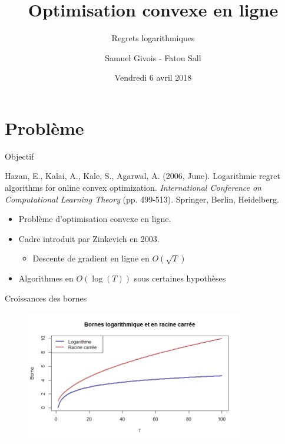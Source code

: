 \documentclass[aspectratio=1610,17pt,utf8]{beamer}
\title[Online Convex Optimization]{Optimisation convexe en ligne}
\subtitle{Regrets logarithmiques}
\author[Givois - Sall]{Samuel Givois - Fatou Sall}
\institute[Ensae]
{
  Apprentissage en ligne\\
  Ensae\\
}
\date{Vendredi 6 avril 2018}
\theoremstyle{definition}
\begin{document}
\begin{frame}[plain]
  \titlepage
\end{frame}

\begin{frame}[plain]
  \tableofcontents
\end{frame}

\section{Problème}

\begin{frame}{Objectif}

{\footnotesize Hazan, E., Kalai, A., Kale, S., Agarwal, A. (2006, June). Logarithmic regret algorithms for online convex optimization. \textit{International Conference on Computational Learning Theory} (pp. 499-513). Springer, Berlin, Heidelberg.}

\begin{itemize}
    \item Problème d'optimisation convexe en ligne.
    \item Cadre introduit par Zinkevich en 2003.
    \begin{itemize}
        \item Descente de gradient en ligne en $O(\sqrt{T})$
    \end{itemize}
    \item Algorithmes en $O(\log(T))$ sous certaines hypothèses
\end{itemize}

\end{frame}

\begin{frame}{Croissances des bornes}
    
\begin{figure}[H]
    \includegraphics[width=0.85\textwidth]{img/borne_log_racine.png}
\end{figure}

\end{frame}
\end{document}
